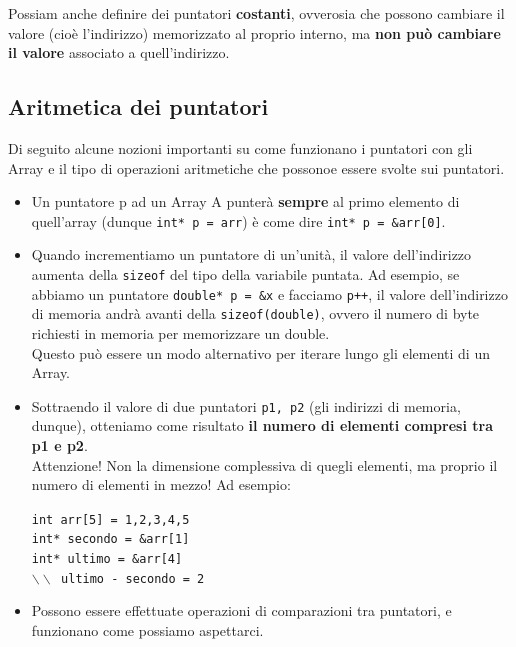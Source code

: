 \documentclass[12pt]{report}
\begin{document}
	Possiam anche definire dei puntatori \textbf{costanti}, ovverosia che possono cambiare il valore (cioè l'indirizzo) memorizzato al proprio interno, ma \textbf{non può cambiare il valore} associato a quell'indirizzo.
	
	\subsection{Aritmetica dei puntatori}
	Di seguito alcune nozioni importanti su come funzionano i puntatori con gli Array e il tipo di operazioni aritmetiche che possonoe essere svolte sui puntatori.
	\begin{itemize}
		\item Un puntatore p ad un Array A punterà \textbf{sempre} al primo elemento di quell'array (dunque \texttt{int* p = arr}) è come dire \texttt{int* p = \&arr[0]}.
		
		\item Quando incrementiamo un puntatore di un'unità, il valore dell'indirizzo aumenta della \texttt{sizeof} del tipo della variabile puntata. Ad esempio, se abbiamo un puntatore \texttt{double* p = \&x} e facciamo \texttt{p++}, il valore dell'indirizzo di memoria andrà avanti della \texttt{sizeof(double)}, ovvero il numero di byte richiesti in memoria per memorizzare un double.\\
		Questo può essere un modo alternativo per iterare lungo gli elementi di un Array.
		
		\item Sottraendo il valore di due puntatori \texttt{p1, p2} (gli indirizzi di memoria, dunque), otteniamo come risultato \textbf{il numero di elementi compresi tra p1 e p2}.\\ Attenzione! Non la dimensione complessiva di quegli elementi, ma proprio il numero di elementi in mezzo! Ad esempio:
		\begin{center}
			\texttt{int arr[5] = {1,2,3,4,5}}\\
			\texttt{int* secondo = \&arr[1]}\\
			\texttt{int* ultimo = \&arr[4]}\\
			\texttt{$\backslash\backslash$ ultimo - secondo = 2}
		\end{center}
		
		\item Possono essere effettuate operazioni di comparazioni tra puntatori, e funzionano come possiamo aspettarci.
	\end{itemize}
	
\end{document}
